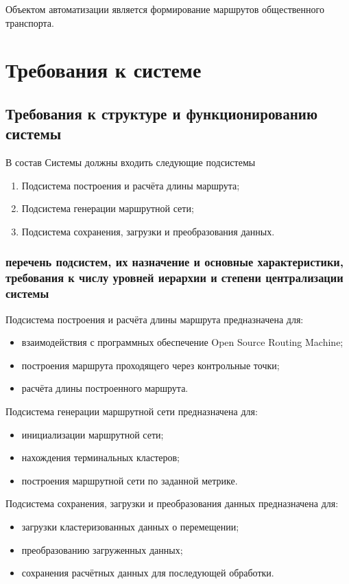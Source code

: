 Объектом автоматизации является формирование маршрутов общественного транспорта.

\chapter{Требования к системе}
\section{Требования к структуре и функционированию системы}
В состав Системы должны входить следующие подсистемы
\begin{enumerate}
    \item Подсистема построения и расчёта длины маршрута;
    \item Подсистема генерации маршрутной сети;
    \item Подсистема сохранения, загрузки и преобразования данных.
\end{enumerate}

\subsection{перечень подсистем, их назначение и основные характеристики, требования к числу уровней 
    иерархии и степени централизации системы}
Подсистема построения и расчёта длины маршрута предназначена для:
\begin{itemize}
    \item взаимодействия с программных обеспечение Open Source Routing Machine;
    \item построения маршрута проходящего через контрольные точки;
    \item расчёта длины построенного маршрута.
\end{itemize}

Подсистема генерации маршрутной сети предназначена для:
\begin{itemize}
    \item инициализации маршрутной сети;
    \item нахождения терминальных кластеров;
    \item построения маршрутной сети по заданной метрике.
\end{itemize}

Подсистема сохранения, загрузки и преобразования данных предназначена для:
\begin{itemize}
    \item загрузки кластеризованных данных о перемещении;
    \item преобразованию загруженных данных;
    \item сохранения расчётных данных для последующей обработки.
\end{itemize}

